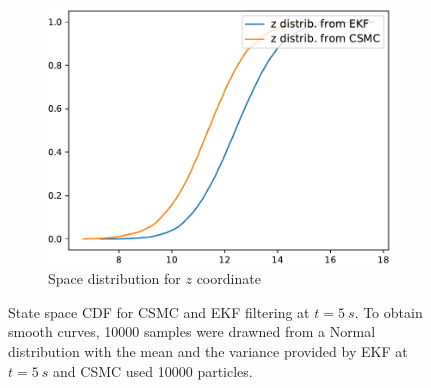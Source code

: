 \documentclass[english, DIV=13]{scrartcl}
\begin{document}
\begin{figure}
\begin{subfigure}{0.49\textwidth}
        \includegraphics[width=\textwidth]{figures/distrib-z}
        \caption{Space distribution for $z$ coordinate} 
        \label{fig:distrib-z}
    \end{subfigure}%
    \caption{State space CDF for CSMC and EKF filtering at $t = \SI{5}{s}$.
    To obtain smooth curves, 10000 samples were drawned from a Normal distribution with
    the mean and the variance provided by EKF at $t = \SI{5}{s}$ and CSMC used 10000
    particles.}
    \label{fig:space-cdf}
\end{figure}


\end{document}
